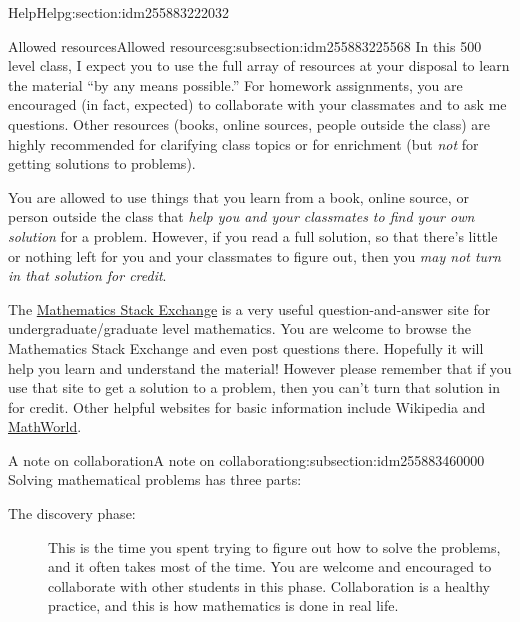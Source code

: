 \documentclass[oneside,10pt,]{article}
\begin{document}
\begin{sectionptx}{Help}{}{Help}{}{}{g:section:idm255883222032}
%
%
\typeout{************************************************}
\typeout{************************************************}
%
\begin{subsectionptx}{Allowed resources}{}{Allowed resources}{}{}{g:subsection:idm255883225568}
In this 500 level class, I expect you to use the full array of resources at your disposal to learn the material ``by any means possible.'' For homework assignments, you are encouraged (in fact, expected) to collaborate with your classmates and to ask me questions. Other resources (books, online sources, people outside the class) are highly recommended for clarifying class topics or for enrichment (but \emph{not} for getting solutions to problems).%
\par
You are allowed to use things that you learn from a book, online source, or person outside the class that \emph{help you and your classmates to find your own solution} for a problem. However, if you read a full solution, so that there's little or nothing left for you and your classmates to figure out, then you \emph{may not turn in that solution for credit}.%
\par
The \href{https://math.stackexchange.com}{Mathematics Stack Exchange} is a very useful question-and-answer site for undergraduate\slash{}graduate level mathematics. You are welcome to browse the Mathematics Stack Exchange and even post questions there. Hopefully it will help you learn and understand the material! However please remember that if you use that site to get a solution to a problem, then you can't turn that solution in for credit. Other helpful websites for basic information include Wikipedia and \href{http://mathworld.wolfram.com}{MathWorld}.%
\end{subsectionptx}
%
%
\typeout{************************************************}
\typeout{************************************************}
%
\begin{subsectionptx}{A note on collaboration}{}{A note on collaboration}{}{}{g:subsection:idm255883460000}
Solving mathematical problems has three parts:%
\begin{description}
\item[{The discovery phase:}]This is the time you spent trying to figure out how to solve the problems, and it often takes most of the time. You are welcome and encouraged to collaborate with other students in this phase. Collaboration is a healthy practice, and this is how mathematics is done in real life.%

\end{description}
\end{subsectionptx}
\end{sectionptx}
\end{document}
